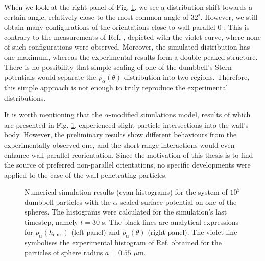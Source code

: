 \documentclass{master_thesis}
\begin{document}
When we look at the right panel of Fig. \ref{fig:different_sterns_simulation}, we see a distribution shift towards a certain angle, relatively close to the most common angle of $32^{\circ}$. However, we still obtain many configurations of the orientations close to wall-parallel $0^{\circ}$. This is contrary to the measurements of Ref. \cite{verweij2021}, depicted with the violet curve, where none of such configurations were observed. Moreover, the simulated distribution has one maximum, whereas the experimental results form a double-peaked structure. There is no possibility that simple scaling of one of the dumbbell's Stern potentials would separate the $p_{\alpha}(\theta)$ distribution into two regions. Therefore, this simple approach is not enough to truly reproduce the experimental distributions.

It is worth mentioning that the $\alpha$-modified simulations model, results of which are presented in Fig. \ref{fig:different_sterns_simulation}, experienced slight particle intersections into the wall's body. However, the preliminary results show different behaviours from the experimentally observed one, and the short-range interactions would even enhance wall-parallel reorientation. Since the motivation of this thesis is to find the source of preferred non-parallel orientations, no specific developments were applied to the case of the wall-penetrating particles.

\begin{figure}
    \centering
    
    \caption{Numerical simulation results (cyan histograms) for the system of $10^5$ dumbbell particles with the $\alpha$-scaled surface potential on one of the spheres. The histograms were calculated for the simulation's last timestep, namely $t = 30$ s. The black lines are analytical expressions for $p_{\alpha}(h_{\textrm{c.m.}})$ (left panel) and $p_{\alpha}(\theta)$ (right panel). The violet line symbolises the experimental histogram of Ref. \cite{verweij2021} obtained for the particles of sphere radius $a=0.55$ $\mu$m.}
    \label{fig:different_sterns_simulation}
\end{figure}
\end{document}
